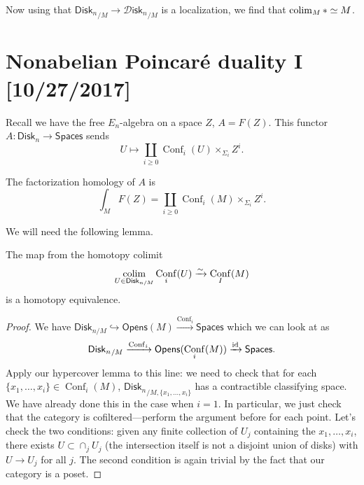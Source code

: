 \documentclass{amsart}
\DeclareMathOperator{\Conf}{Conf}
\newcommand{\disk}{\mathsf{Disk}_n}
\newcommand{\diskm}{\mathsf{Disk}_{n/M}}
\newcommand{\Disk}{\mathscr{D}\mathsf{isk}_n}
\begin{document}
Now using that ${\disk}_{/M}\to {\Disk}_{/M}$ is a localization, we find that $\operatorname*{colim}_M *\simeq M$.

\newpage

\section{Nonabelian Poincar\'e duality I [10/27/2017]}

\begin{example}
    Recall we have the free $E_n$-algebra on a space $Z$, $A=F(Z)$.
    This functor $A:\disk\to \mathsf{Spaces}$ sends
    \begin{equation*}
        U\mapsto \coprod_{i\geqslant0} \Conf_i(U)\times_{\Sigma_i}Z^i.
    \end{equation*}
\end{example}

\begin{proposition}
    The factorization homology of $A$ is
    \begin{equation*}
        \int_{M} F(Z) = \coprod_{i\geqslant 0}\Conf_i(M)\times_{\Sigma_i} Z^i.
    \end{equation*}
\end{proposition}

We will need the following lemma.
\begin{lemma}
    The map from the homotopy colimit
    \begin{equation*}
        \colim_{U\in\diskm} \Conf_i(U)\xrightarrow{\sim} \Conf_I(M)
    \end{equation*}
    is a homotopy equivalence.
\end{lemma}
\begin{proof}
    We have
    $\diskm \hookrightarrow \mathsf{Opens}(M)\xrightarrow{\Conf_i} \mathsf{Spaces}$
    which we can look at as
    \begin{equation*}
        {\disk}_{/M} \xrightarrow{\Conf_i}\mathsf{Opens}(\Conf_i(M))\xrightarrow{\id}\mathsf{Spaces}.
    \end{equation*}
    Apply our hypercover lemma to this line: we need to check that for each $\{x_1,\ldots,x_i\}\in\Conf_i(M)$,
    ${\disk}_{/M, \{x_1,\ldots,x_i\}}$ has a contractible classifying space. We have
    already done this in the case when $i=1$. In particular, we just check that the
    category is cofiltered---perform the argument before for each point. Let's check
    the two conditions: given any finite collection of $U_j$ containing the $x_1,\ldots, x_i$,
    there exists $U\subset\cap_j U_j$ (the intersection itself is not a disjoint union of disks)
    with $U\to U_j$ for all $j$. The second condition is again trivial by the fact
    that our category is a poset.
\end{proof}
\end{document}

